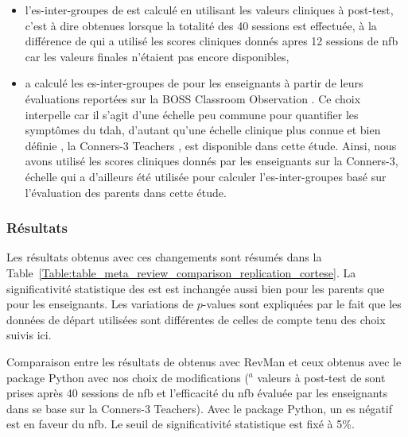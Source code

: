 \begin{itemize}
\item l'\gls{es}-inter-groupes de \citet{Arnold2014} est calculé en utilisant les valeurs cliniques à post-test, c'est à dire obtenues lorsque la totalité 
des 40 sessions est effectuée, à la différence de \citet{Cortese2016} qui a utilisé les scores cliniques donnés apres 12 sessions de \gls{nfb} car les valeurs 
finales n'étaient pas encore disponibles,
\item \citet{Cortese2016} a calculé les \gls{es}-inter-groupes de \citet{Steiner2014} pour les enseignants à partir de leurs évaluations reportées sur 
la BOSS Classroom Observation \citep{Shapiro2010}. Ce choix interpelle car il s'agit d'une échelle peu commune pour quantifier les symptômes du \gls{tdah}, d'autant qu'une échelle clinique 
plus connue et bien définie \citep{Collett2003, Epstein2012, Bluschke2016}, la Conners-3 Teachers \citep{Conners1998, Conners2008}, est disponible dans 
cette étude. Ainsi, nous avons utilisé les scores cliniques donnés par les enseignants sur la Conners-3, échelle 
qui a d'ailleurs été utilisée pour calculer l'\gls{es}-inter-groupes basé sur l'évaluation des parents dans cette étude. 
\end{itemize}

\subsubsection{Résultats}

Les résultats obtenus avec ces changements sont résumés dans la Table~\ref{Table:table_meta_review_comparison_replication_cortese}.
La significativité statistique des \gls{est} est inchangée aussi bien pour les parents que pour les enseignants. Les variations de $p$-values sont expliquées
par le fait que les données de départ utilisées sont différentes de celles de \citet{Cortese2016} compte tenu des choix suivis ici.

\begin{table}[h!]
  \centering
  \caption[Comparaison entre les résultats de \citet{Cortese2016} et ceux de la réplication avec nos choix de modifications.]{Comparaison entre les résultats de \citet{Cortese2016} obtenus avec RevMan \citep{Revman} et ceux obtenus avec le package Python \citep{Bussalb2019clinical}
	avec nos choix de modifications ($^a$ valeurs à post-test de \citet{Arnold2014} sont prises après 40 sessions de \gls{nfb} et l'efficacité du \gls{nfb} évaluée 
	par les enseignants dans \citet{Steiner2014} se base sur la Conners-3 Teachers).
	Avec le package Python, un \gls{es} négatif est en faveur du \gls{nfb}. Le seuil de significativité statistique est fixé à 5\%.}
  
  \label{Table:table_meta_review_comparison_replication_cortese}
\end{table}

